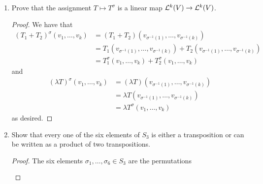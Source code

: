 \documentclass[../psets.tex]{subfiles}
\begin{document}
\begin{enumerate}[label={\textbf{1.4.\roman*.}}]
\begin{proof}
        as desired.\par
        The proof is symmetric for even permutations.
    \end{proof}
    \item Prove that the assignment $T\mapsto T^\sigma$ is a linear map $\lin[k]{V}\to\lin[k]{V}$.
    \begin{proof}
        We have that
        \begin{align*}
            (T_1+T_2)^\sigma(v_1,\dots,v_k) &= (T_1+T_2)(v_{\sigma^{-1}(1)},\dots,v_{\sigma^{-1}(k)})\\
            &= T_1(v_{\sigma^{-1}(1)},\dots,v_{\sigma^{-1}(k)})+T_2(v_{\sigma^{-1}(1)},\dots,v_{\sigma^{-1}(k)})\\
            &= T_1^\sigma(v_1,\dots,v_k)+T_2^\sigma(v_1,\dots,v_k)
        \end{align*}
        and
        \begin{align*}
            (\lambda T)^\sigma(v_1,\dots,v_k) &= (\lambda T)(v_{\sigma^{-1}(1)},\dots,v_{\sigma^{-1}(k)})\\
            &= \lambda T(v_{\sigma^{-1}(1)},\dots,v_{\sigma^{-1}(k)})\\
            &= \lambda T^\sigma(v_1,\dots,v_k)
        \end{align*}
        as desired.
    \end{proof}
    \setcounter{enumi}{5}
    \item Show that every one of the six elements of $S_3$ is either a transposition or can be written as a product of two transpositions.
    \begin{proof}
        The six elements $\sigma_1,\dots,\sigma_6\in S_3$ are the permutations
        \begin{center}
            \small
\end{center}
\end{proof}
\end{enumerate}
\end{document}
